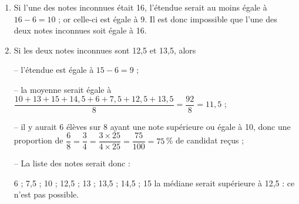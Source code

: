 \documentclass[10pt]{article}
\begin{document}
%
%
%
%
%
%		
%
%	
%	
%		

\begin{enumerate}
\item %
Si l'une des notes inconnues était 16, l'étendue serait au moins égale à $16 - 6 = 10$ ; or celle-ci est égale à 9.
Il est donc impossible que l'une des deux notes inconnues soit égale à 16.	
\item %
Si les deux notes inconnues sont 12,5 et 13,5, alors 

-- l'étendue est égale à $15 - 6 = 9$ ;

-- la moyenne serait égale à $\dfrac{10 + 13 + 15 + 14,5 + 6 + 7,5 + 12,5 + 13,5}{8} = \dfrac{92}{8} = 11,5$ ; 

-- il y aurait 6 élèves sur 8 ayant une note supérieure ou égale à 10, donc une proportion de $\dfrac{6}{8} = \dfrac{3}{4} = \dfrac{3 \times 25}{4 \times 25} = \dfrac{75}{100} = 75$\,\% de candidat reçus ; 

-- La liste des notes serait donc :

6 ; 7,5 ; 10 ; 12,5 ; 13 ; 13,5 ; 14,5 ; 15 la médiane serait supérieure à 12,5 : ce n'est pas possible.
\end{enumerate}
\end{document}

